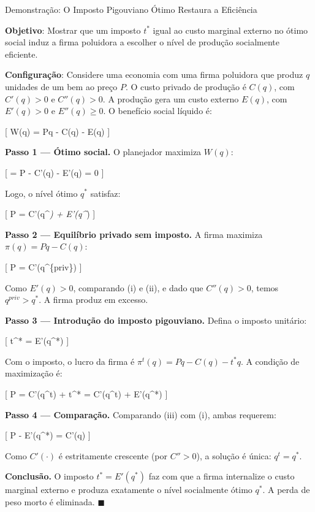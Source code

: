 \documentclass[11pt,twoside,openright]{book}
\begin{document}
\begin{proofbox}{Demonstração: O Imposto Pigouviano Ótimo Restaura a Eficiência}

\textbf{Objetivo}: Mostrar que um imposto \(t^*\) igual ao custo
marginal externo no ótimo social induz a firma poluidora a escolher o
nível de produção socialmente eficiente.

\textbf{Configuração}: Considere uma economia com uma firma poluidora
que produz \(q\) unidades de um bem ao preço \(P\). O custo privado de
produção é \(C(q)\), com \(C'(q) > 0\) e \(C''(q) > 0\). A produção gera
um custo externo \(E(q)\), com \(E'(q) > 0\) e \(E''(q) \geq 0\). O
benefício social líquido é:

{[} W(q) = Pq - C(q) - E(q) {]}

\textbf{Passo 1 --- Ótimo social.} O planejador maximiza \(W(q)\):

{[}  = P - C'(q) - E'(q) = 0 {]}

Logo, o nível ótimo \(q^*\) satisfaz:

{[} P = C'(q\^{}\emph{) + E'(q\^{}})  {]}

\textbf{Passo 2 --- Equilíbrio privado sem imposto.} A firma maximiza
\(\pi(q) = Pq - C(q)\):

{[} P = C'(q\^{}\{priv\})  {]}

Como \(E'(q) > 0\), comparando (i) e (ii), e dado que \(C''(q) > 0\),
temos \(q^{priv} > q^*\). A firma produz em excesso.

\textbf{Passo 3 --- Introdução do imposto pigouviano.} Defina o imposto
unitário:

{[} t\^{}* = E'(q\^{}*) {]}

Com o imposto, o lucro da firma é \(\pi^t(q) = Pq - C(q) - t^* q\). A
condição de maximização é:

{[} P = C'(q\^{}t) + t\^{}* = C'(q\^{}t) + E'(q\^{}*)  {]}

\textbf{Passo 4 --- Comparação.} Comparando (iii) com (i), ambas
requerem:

{[} P - E'(q\^{}*) = C'(q) {]}

Como \(C'(\cdot)\) é estritamente crescente (por \(C'' > 0\)), a solução
é única: \(q^t = q^*\).

\textbf{Conclusão.} O imposto \(t^* = E'(q^*)\) faz com que a firma
internalize o custo marginal externo e produza exatamente o nível
socialmente ótimo \(q^*\). A perda de peso morto é eliminada.
\(\blacksquare\)

\end{proofbox}
\end{document}
